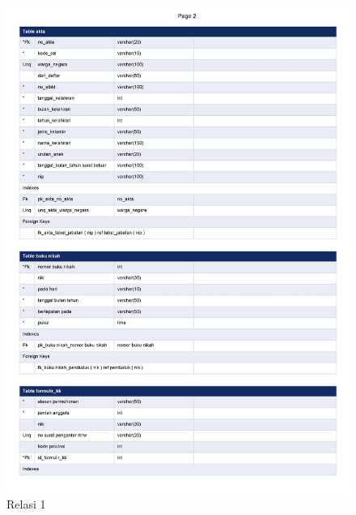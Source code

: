 \begin{figure}[H]
	\centering
	\includegraphics[width=12cm]{figures/0003.jpg}
	\caption{Relasi 1}
\end{figure}

